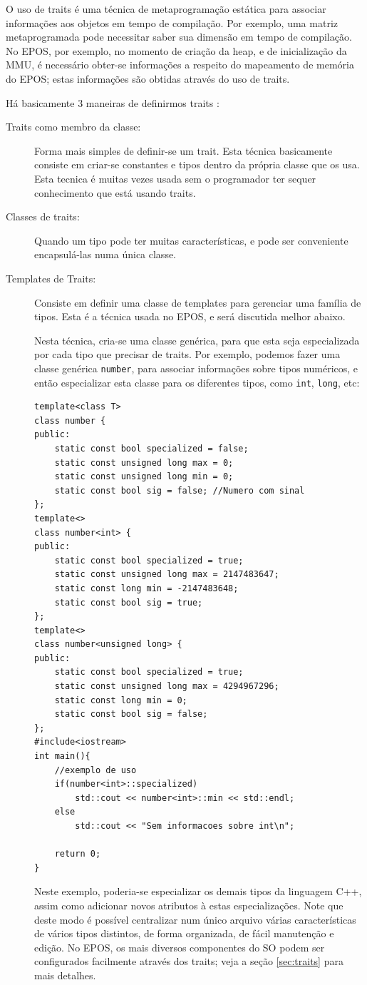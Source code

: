 O uso de traits é uma técnica de metaprogramação estática para associar informações aos objetos em tempo de compilação. Por exemplo, uma matriz metaprogramada pode necessitar saber sua dimensão em tempo de compilação. No EPOS, por exemplo, no momento de criação da heap, e de inicialização da MMU, é necessário obter-se informações a respeito do mapeamento de memória do EPOS; estas informações são obtidas através do uso de traits.

Há basicamente 3 maneiras de definirmos traits \cite{generative}:

\begin{description}
\item[Traits como membro da classe:] Forma mais simples de definir-se um trait. Esta técnica basicamente consiste em criar-se constantes e tipos dentro da própria classe que os usa. Esta tecnica é muitas vezes usada sem o programador ter sequer conhecimento que está usando traits.

\item[Classes de traits:] Quando um tipo pode ter muitas características, e pode ser conveniente encapsulá-las numa única classe.

\item[Templates de Traits:] Consiste em definir uma classe de templates para gerenciar uma família de tipos. Esta é a técnica usada no EPOS, e será discutida melhor abaixo.

Nesta técnica, cria-se uma classe genérica, para que esta seja especializada por cada tipo que precisar de traits. Por exemplo, podemos fazer uma classe genérica \verb+number+, para associar informações sobre tipos numéricos, e então especializar esta classe para os diferentes tipos, como \verb+int+, \verb+long+, etc:

\begin{lstlisting}
template<class T>
class number {
public:
	static const bool specialized = false;
	static const unsigned long max = 0;
	static const unsigned long min = 0;
	static const bool sig = false; //Numero com sinal
};
template<>
class number<int> {
public:
	static const bool specialized = true;
	static const unsigned long max = 2147483647;
	static const long min = -2147483648;
	static const bool sig = true;
};
template<>
class number<unsigned long> {
public:
	static const bool specialized = true;
	static const unsigned long max = 4294967296;
	static const long min = 0;
	static const bool sig = false;
};
#include<iostream>
int main(){
	//exemplo de uso
	if(number<int>::specialized)
		std::cout << number<int>::min << std::endl;
	else
		std::cout << "Sem informacoes sobre int\n";
	
	return 0;
}
\end{lstlisting}

Neste exemplo, poderia-se especializar os demais tipos da linguagem C++, assim como adicionar novos atributos à estas especializações. Note que deste modo é possível centralizar num único arquivo várias características de vários tipos distintos, de forma organizada, de fácil manutenção e edição. No EPOS, os mais diversos componentes do SO podem ser configurados facilmente através dos traits; veja a seção \ref{sec:traits} para mais detalhes.
\end{description}

